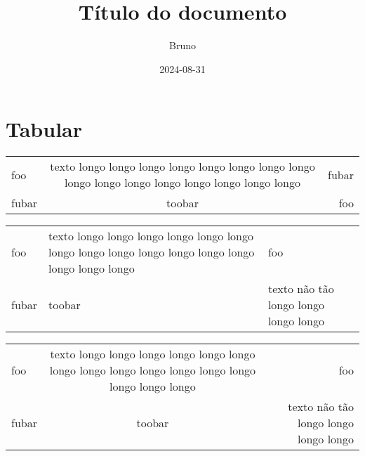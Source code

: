 \documentclass[dsc,male,12pt,a4paper]{ita}
\title{Título do documento}
\author{Bruno}
\date{2024-08-31}
\begin{document}
\frontmatter
\maketitle

\listoffigures
\listoftables

\tableofcontents

\mainmatter
\chapter{Tabular}

\centering
\begin{tabular}{|l|c|r|}
	\hline
	foo                                                                                                   &
	texto longo longo longo longo longo longo longo longo longo longo longo longo longo longo longo longo &
	fubar                                                                                                   \\ fubar                                                                                                 &
	toobar                                                                                                &
	foo                                                                                                     \\
	\hline
\end{tabular}

\centering
\begin{tabularx}{\textwidth}{|l|X|X|}
	\hline
	foo                                                                                                   &
	texto longo longo longo longo longo longo longo longo longo longo longo longo longo longo longo longo &
	foo                                                                                                     \\
	fubar                                                                                                 &
	toobar                                                                                                &
	texto não tão longo longo longo longo                                                                   \\
	\hline
\end{tabularx}

\centering
\begin{tabulary}{\textwidth}{|l|C|R|}
	\hline
	foo                                                                                                   &
	texto longo longo longo longo longo longo longo longo longo longo longo longo longo longo longo longo &
	foo                                                                                                     \\
	fubar                                                                                                 &
	toobar                                                                                                &
	texto não tão longo longo longo longo                                                                   \\
	\hline
\end{tabulary}
\end{document}
